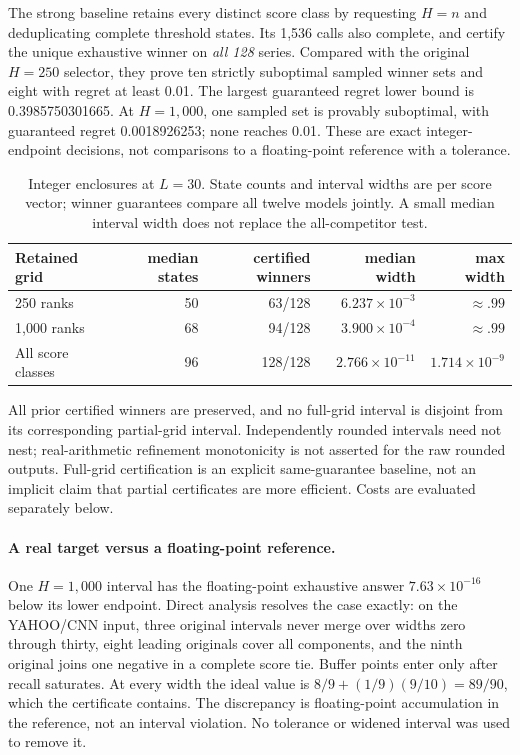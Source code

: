 The strong baseline retains every distinct score class by requesting
$H=n$ and deduplicating complete threshold states. Its 1,536 calls also
complete, and certify the unique exhaustive winner on \emph{all 128}
series. Compared with the original $H=250$ selector, they prove ten
strictly suboptimal sampled winner sets and eight with regret at least
0.01. The largest guaranteed regret lower bound is 0.3985750301665.
At $H=1,000$, one sampled set is provably suboptimal, with guaranteed
regret 0.0018926253; none reaches 0.01. These are exact integer-endpoint
decisions, not comparisons to a floating-point reference with a tolerance.

\begin{table}[t]
\caption{Integer enclosures at $L=30$. State counts and interval widths
are per score vector; winner guarantees compare all twelve models jointly.
A small median interval width does not replace the all-competitor test.}
\label{tab:certificates}

\centering\small
\begin{tabular}{lrrrr}
\toprule
Retained grid & median states & certified winners & median width & max width\\
\midrule
250 ranks & 50 & 63/128 & $6.237\times10^{-3}$ & $\approx .99$\\
1,000 ranks & 68 & 94/128 & $3.900\times10^{-4}$ & $\approx .99$\\
All score classes & 96 & 128/128 & $2.766\times10^{-11}$ & $1.714\times10^{-9}$\\
\bottomrule
\end{tabular}

\end{table}

All prior certified winners are preserved, and no full-grid interval is
disjoint from its corresponding partial-grid interval. Independently
rounded intervals need not nest; real-arithmetic refinement monotonicity
is not asserted for the raw rounded outputs. Full-grid certification is
an explicit same-guarantee baseline, not an implicit claim that partial
certificates are more efficient. Costs are evaluated separately below.

\paragraph{A real target versus a floating-point reference.}
One $H=1,000$ interval has the floating-point exhaustive answer
$7.63\times10^{-16}$ below its lower endpoint. Direct analysis resolves
the case exactly: on the YAHOO/CNN input, three original intervals never
merge over widths zero through thirty, eight leading originals cover all
components, and the ninth original joins one negative in a complete score
tie. Buffer points enter only after recall saturates. At every width the
ideal value is $8/9+(1/9)(9/10)=89/90$, which the certificate contains.
The discrepancy is floating-point accumulation in the reference, not an
interval violation. No tolerance or widened interval was used to remove it.

